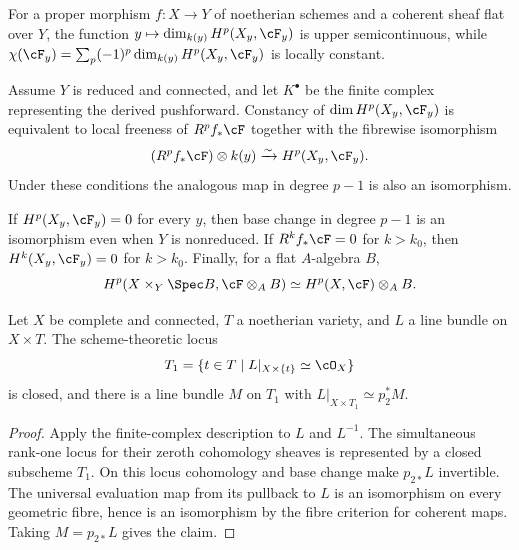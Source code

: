 \begin{theorem}
\label{mumford-thm-semicontinuity}
For a proper morphism $f:X\to Y$ of noetherian schemes and a coherent sheaf
flat over $Y$, the function
$y\mapsto\dim_{k(y)}H^p(X_y,\cF_y)$ is upper semicontinuous, while
$\chi(\cF_y)=\sum_p(-1)^p\dim_{k(y)}H^p(X_y,\cF_y)$ is locally constant.
\notready
\end{theorem}

\begin{theorem}
\label{mumford-thm-base-change-criterion}
Assume $Y$ is reduced and connected, and let $K^\bullet$ be the finite complex
representing the derived pushforward.  Constancy of $\dim H^p(X_y,\cF_y)$ is equivalent to local freeness of
$R^pf_*\cF$ together with the fibrewise isomorphism
\[
 (R^pf_*\cF)\otimes k(y)\xrightarrow{\sim}H^p(X_y,\cF_y).
\]
Under these conditions the analogous map in degree $p-1$ is also an
isomorphism.
\notready
\end{theorem}

\begin{corollary}
\label{mumford-cor-flat-base-change}
If $H^p(X_y,\cF_y)=0$ for every $y$, then base change in degree $p-1$ is an
isomorphism even when $Y$ is nonreduced.  If $R^kf_*\cF=0$ for $k>k_0$, then
$H^k(X_y,\cF_y)=0$ for $k>k_0$.  Finally, for a flat $A$-algebra $B$,
\[
 H^p(X\times_Y\Spec B,\cF\otimes_A B)\simeq H^p(X,\cF)\otimes_A B.
\]
\notready
\end{corollary}

\begin{theorem}
\label{mumford-thm-seesaw}
Let $X$ be complete and connected, $T$ a noetherian variety, and $L$ a line
bundle on $X\times T$.  The scheme-theoretic locus
\[
 T_1=\{t\in T\mid L|_{X\times\{t\}}\simeq\cO_X\}
\]
is closed, and there is a line bundle $M$ on $T_1$ with
$L|_{X\times T_1}\simeq p_2^*M$.
\begin{proof}
Apply the finite-complex description to $L$ and $L^{-1}$.  The simultaneous
rank-one locus for their zeroth cohomology sheaves is represented by a closed
subscheme $T_1$.  On this locus cohomology and base change make
$p_{2*}L$ invertible.  The universal evaluation map from its pullback to $L$
is an isomorphism on every geometric fibre, hence is an isomorphism by the
fibre criterion for coherent maps.  Taking $M=p_{2*}L$ gives the claim.
\end{proof}
\notready
\end{theorem}

